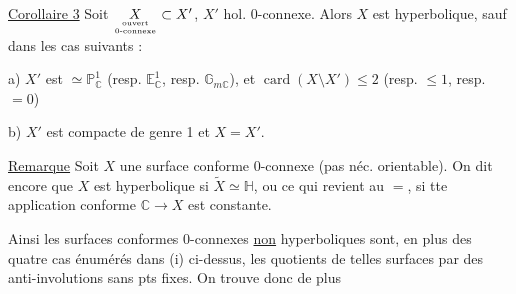 \uline{Corollaire 3} Soit $\underset{\text{ouvert}\atop\text{0-connexe}}{X}\subset X'$, $X'$ hol. 0-connexe. Alors $X$ est hyperbolique, sauf dans les cas suivants :

a) $X'$ est $\simeq\mathbb P^1_{\mathbb C}$ (resp. $\mathbb E^1_{\mathbb C}$, resp. $\mathbb G_{m\mathbb C}$), et $\operatorname{card}(X\setminus X')\leq2$ (resp. $\leq1$, resp. $=0$)

b) $X'$ est compacte de genre 1 et $X=X'$.

\uline{Remarque} Soit  $X$ une surface conforme 0-connexe (pas néc. orientable). On dit encore que $X$ est hyperbolique si $\widetilde X\simeq\mathbb H$, ou ce qui revient au $=$, si tte application conforme $\mathbb C\longrightarrow X$ est constante.


Ainsi les surfaces conformes  0-connexes \uline{non} hyperboliques sont, en plus des quatre cas énumérés dans (i) ci-dessus, les quotients de telles surfaces par des anti-involutions sans pts fixes. On trouve donc de plus
